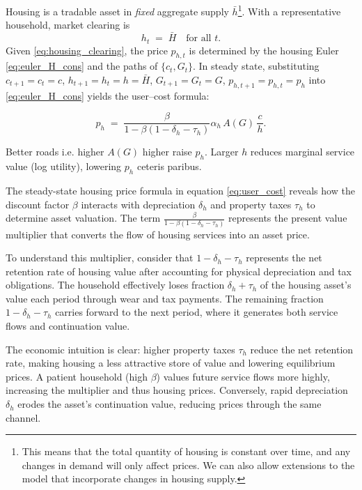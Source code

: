 Housing is a tradable asset in \emph{fixed} aggregate supply $\bar h$\footnote{This means that the total quantity of housing is constant over time, and any changes in demand will only affect prices. We can also allow extensions to the model that incorporate changes in housing supply.}. With a representative household, market clearing is
\begin{equation}
h_t \;=\; \bar H \quad \text{for all } t.
\label{eq:housing_clearing}
\end{equation}
Given \eqref{eq:housing_clearing}, the price $p_{h,t}$ is determined by the housing Euler \eqref{eq:euler_H_cons} and the paths of $\{c_t,G_t\}$. In steady state, substituting $c_{t+1}\!=\!c_t\!=\!c$, $h_{t+1}\!=\!h_t\!=\!h\!=\!\bar H$, $G_{t+1}\!=\!G_t\!=\!G$, $p_{h,t+1}\!=\!p_{h,t}\!=\!p_h$ into \eqref{eq:euler_H_cons} yields the user–cost formula:

\begin{equation}
p_h \;=\; \frac{\beta}{1 - \beta(1 - \delta_h - \tau_h)} \alpha_h\,A(G)\,\dfrac{c}{h} .
\label{eq:user_cost}
\end{equation}

Better roads i.e. higher $A(G)$ higher raise $p_h$. Larger $h$ reduces marginal service value (log utility), lowering $p_h$ ceteris paribus.

The steady-state housing price formula in equation \eqref{eq:user_cost} reveals how the discount factor $\beta$ interacts with depreciation $\delta_h$ and property taxes $\tau_h$ to determine asset valuation. The term $\frac{\beta}{1 - \beta(1 - \delta_h - \tau_h)}$ represents the present value multiplier that converts the flow of housing services into an asset price.

To understand this multiplier, consider that $1 - \delta_h - \tau_h$ represents the net retention rate of housing value after accounting for physical depreciation and tax obligations. The household effectively loses fraction $\delta_h + \tau_h$ of the housing asset's value each period through wear and tax payments. The remaining fraction $1 - \delta_h - \tau_h$ carries forward to the next period, where it generates both service flows and continuation value.

The economic intuition is clear: higher property taxes $\tau_h$ reduce the net retention rate, making housing a less attractive store of value and lowering equilibrium prices. A patient household (high $\beta$) values future service flows more highly, increasing the multiplier and thus housing prices. Conversely, rapid depreciation $\delta_h$ erodes the asset's continuation value, reducing prices through the same channel.

